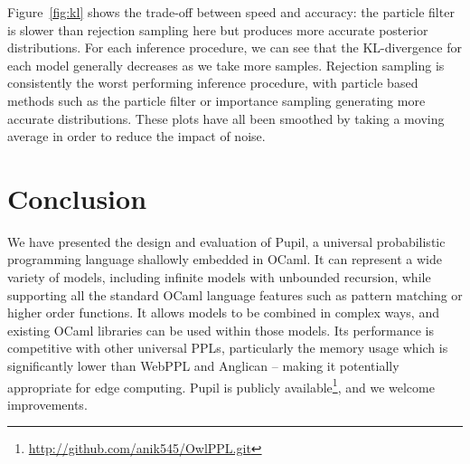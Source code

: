\documentclass[sigconf]{acmart}
\newcommand{\pupil}{Pupil\xspace}
\begin{document}
Figure~\ref{fig:kl} shows the trade-off between speed and accuracy: the particle filter is slower than rejection sampling here but produces more accurate posterior distributions. For each inference procedure, we can see that the KL-divergence for each model generally decreases as we take more samples. Rejection sampling is consistently the worst performing inference procedure, with particle based methods such as the particle filter or importance sampling generating more accurate distributions. These plots have all been smoothed by taking a moving average in order to reduce the impact of noise.

\section{Conclusion}
\label{s:conclusion}

We have presented the design and evaluation of \pupil, a universal probabilistic programming language shallowly embedded in OCaml. It can represent a wide variety of models, including infinite models with unbounded recursion, while supporting all the standard OCaml language features such as pattern matching or higher order functions. It allows models to be combined in complex ways, and existing OCaml libraries can be used within those models. Its performance is competitive with other universal PPLs, particularly the memory usage which is significantly lower than WebPPL and Anglican -- making it potentially appropriate for edge computing. \pupil is publicly available\footnote{\url{http://github.com/anik545/OwlPPL.git}}, and we welcome improvements.


{
  
  
}
\end{document}
